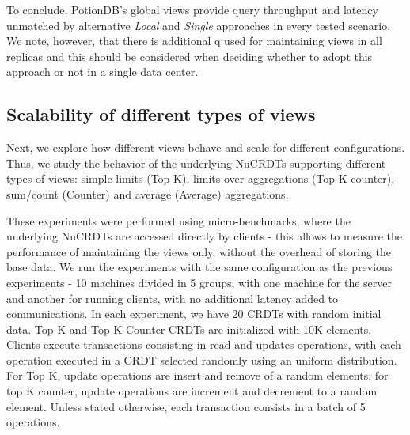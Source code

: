 \documentclass[sigplan,twocolumn,review,anonymous]{acmart}
\begin{document}
To conclude, PotionDB's global views provide query throughput and latency unmatched by alternative 
\textit{Local} and \emph{Single} approaches in every tested scenario.
We note, however,  that there is additional q used for maintaining views in all replicas and this
should be considered when deciding whether to adopt this approach or not in a single data center.


\subsection{Scalability of different types of views}
\label{subsec:microbenchmarks}

Next, we explore how different views behave and scale for different configurations. 
Thus,  we study the behavior of the underlying NuCRDTs supporting different types of 
views: simple limits (Top-K), limits over aggregations (Top-K counter), sum/count (Counter) and average (Average) aggregations.

These experiments were performed using micro-benchmarks, where the underlying NuCRDTs are 
accessed directly by clients - this allows to measure the performance of maintaining the views 
only, without the overhead of storing the base data.
We run the experiments with the same configuration as the previous experiments - 10 machines
divided in 5 groups, with one machine for the server and another for running clients, with no
additional latency added to communications.  
In each experiment, we have 20 CRDTs with random initial data.
Top K and Top K Counter CRDTs are initialized with 10K elements. 
Clients execute transactions consisting in read and updates operations, with each operation 
executed in a CRDT selected randomly using an uniform distribution. For Top K, update operations
are insert and remove of a random elements; for top K counter, update operations are increment 
and decrement to a random element.
Unless stated otherwise, each transaction consists in a batch of 5 operations.
\end{document}
